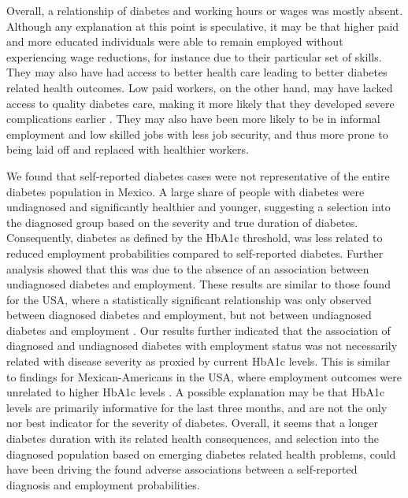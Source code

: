 \documentclass[12pt,english]{article}
\begin{document}
Overall, a relationship of diabetes and working hours or wages was mostly absent. Although any explanation at this point is speculative, it may be that higher paid and more educated individuals were able to remain employed without experiencing wage reductions, for instance due to their particular set of skills. They may also have had access to better health care leading to better diabetes related health outcomes. Low paid workers, on the other hand, may have lacked access to quality diabetes care, making it more likely that they developed severe complications earlier \parencite{Flores-Hernandez2015}. They may also have been more likely to be in informal employment and low skilled jobs with less job security, and thus more prone to being laid off and replaced with healthier workers.

We found that self-reported diabetes cases were not representative of the entire diabetes population in Mexico. A large share of people with diabetes were undiagnosed and significantly healthier and younger, suggesting a selection into the diagnosed group based on the severity and true duration of diabetes. Consequently, diabetes as defined by the \ac{HbA1c} threshold, was less related to reduced employment probabilities compared to self-reported diabetes. Further analysis showed that this was due to the absence of an association between undiagnosed diabetes and employment. These results are similar to those found for the USA, where a statistically significant relationship was only observed between diagnosed diabetes and employment, but not between undiagnosed diabetes and employment \parencite{Minor2015}. Our results further indicated that the association of diagnosed and undiagnosed diabetes with employment status was not necessarily related with disease severity as proxied by current \ac{HbA1c} levels. This is similar to findings for Mexican-Americans in the USA, where employment outcomes were unrelated to higher \ac{HbA1c} levels \parencite{BrownIII2011}. A possible explanation may be that \ac{HbA1c} levels are primarily informative for the last three months, and are not the only nor best indicator for the severity of diabetes. Overall, it seems that a longer diabetes duration with its related health consequences, and selection into the diagnosed population based on emerging diabetes related health problems, could have been driving the found adverse associations between a self-reported diagnosis and employment probabilities.
\end{document}
